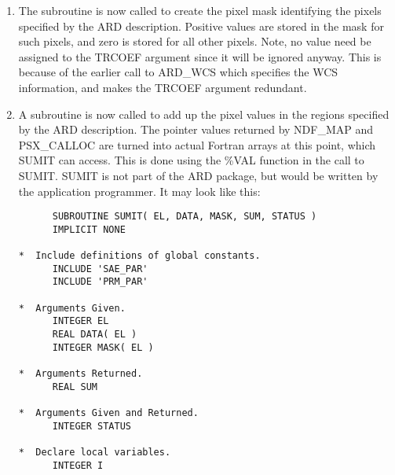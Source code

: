 \begin{enumerate}
\item The subroutine  is now called to create 
the pixel mask identifying the pixels specified by the ARD description.
Positive values are stored in the mask for such pixels, and zero is
stored for all other pixels. Note, no value need be assigned to the TRCOEF 
argument since it will be ignored anyway. This is because of the earlier call 
to ARD\_WCS which specifies the WCS information, and makes the TRCOEF
argument redundant. 

\item A subroutine is now called to add up the pixel values in the regions
specified by the ARD description. The pointer values returned by NDF\_MAP and
PSX\_CALLOC are turned into actual Fortran arrays at this point, which SUMIT can
access. This is done using the \%VAL function in the call to SUMIT. SUMIT
is not part of the ARD package, but would be written by the application
programmer. It may look like this: 

\small
\begin{verbatim}
      SUBROUTINE SUMIT( EL, DATA, MASK, SUM, STATUS )         
      IMPLICIT NONE                                           
                                                              
*  Include definitions of global constants.                   
      INCLUDE 'SAE_PAR'                                       
      INCLUDE 'PRM_PAR'                                        
                                                              
*  Arguments Given.                                           
      INTEGER EL                                              
      REAL DATA( EL )                                         
      INTEGER MASK( EL )                                      
                                                              
*  Arguments Returned.                                        
      REAL SUM                                                
                                                              
*  Arguments Given and Returned.                              
      INTEGER STATUS                                          
                                                              
*  Declare local variables.                                   
      INTEGER I                                               
                                                              

\end{verbatim}
\end{enumerate}
